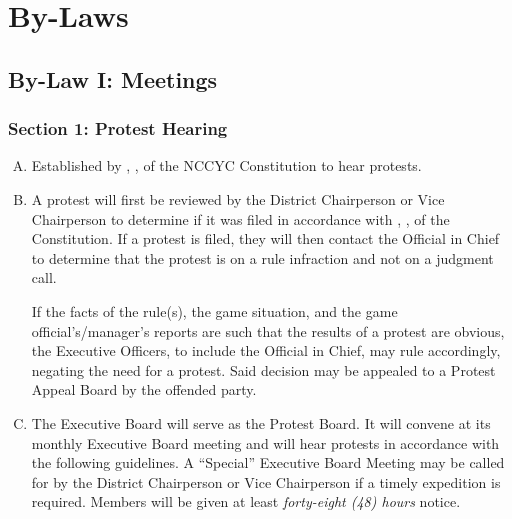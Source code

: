 \chapter{By-Laws}
\label{chap:bylaw}
\section{By-Law I: Meetings}
\label{sec:bylaw-1}
\subsection{Section 1: Protest Hearing}
\label{ssec:bylaw-1-1}
\begin{enumerate}[A.]
    \item Established by , , of the NCCYC Constitution to hear protests.
    \item A protest will first be reviewed by the District Chairperson or Vice Chairperson to determine if it was filed in accordance with , , of the Constitution.  If a protest is filed, they will then contact the Official in Chief to determine that the protest is on a rule infraction and not on a judgment call.
    
    If the facts of the rule(s), the game situation, and the game official’s/manager’s reports are such that the results of a protest are obvious, the Executive Officers, to include the Official in Chief, may rule accordingly, negating the need for a protest.  Said decision may be appealed to a Protest Appeal Board by the offended party.
    \item The Executive Board will serve as the Protest Board. It will convene at its monthly Executive Board meeting and will hear protests in accordance with the following guidelines. A ``Special'' Executive Board Meeting may be called for by the District Chairperson or Vice Chairperson if a timely expedition is required. Members will be given at least {\em forty-eight (48) hours} notice.
\end{enumerate}

